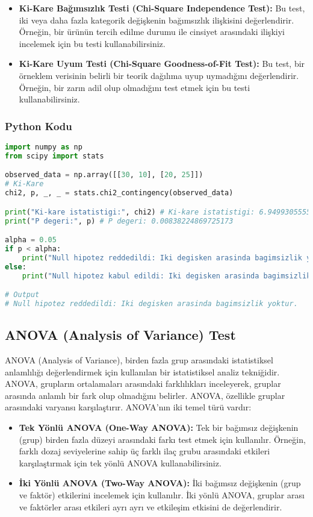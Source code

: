 \begin{itemize}
    \item \textbf{Ki-Kare Bağımsızlık Testi (Chi-Square Independence Test):} Bu test, iki veya daha fazla kategorik değişkenin bağımsızlık ilişkisini değerlendirir. Örneğin, bir ürünün tercih edilme durumu ile cinsiyet arasındaki ilişkiyi incelemek için bu testi kullanabilirsiniz.
    \item \textbf{Ki-Kare Uyum Testi (Chi-Square Goodness-of-Fit Test):} Bu test, bir örneklem verisinin belirli bir teorik dağılıma uyup uymadığını değerlendirir. Örneğin, bir zarın adil olup olmadığını test etmek için bu testi kullanabilirsiniz.
\end{itemize}

\subsubsection{Python Kodu}

\begin{lstlisting}[language=Python]
import numpy as np
from scipy import stats

observed_data = np.array([[30, 10], [20, 25]])
# Ki-Kare
chi2, p, _, _ = stats.chi2_contingency(observed_data)

print("Ki-kare istatistigi:", chi2) # Ki-kare istatistigi: 6.949930555555551
print("P degeri:", p) # P degeri: 0.00838224869725173

alpha = 0.05
if p < alpha:
    print("Null hipotez reddedildi: Iki degisken arasinda bagimsizlik yoktur.")
else:
    print("Null hipotez kabul edildi: Iki degisken arasinda bagimsizlik vardir.")

# Output
# Null hipotez reddedildi: Iki degisken arasinda bagimsizlik yoktur.
\end{lstlisting}

\newpage

\subsection{ANOVA (Analysis of Variance) Test}
ANOVA (Analysis of Variance), birden fazla grup arasındaki istatistiksel anlamlılığı değerlendirmek için kullanılan bir istatistiksel analiz tekniğidir. ANOVA, grupların ortalamaları arasındaki farklılıkları inceleyerek, gruplar arasında anlamlı bir fark olup olmadığını belirler. ANOVA, özellikle gruplar arasındaki varyansı karşılaştırır. ANOVA'nın iki temel türü vardır:

\begin{itemize}
    \item \textbf{Tek Yönlü ANOVA (One-Way ANOVA):} Tek bir bağımsız değişkenin (grup) birden fazla düzeyi arasındaki farkı test etmek için kullanılır. Örneğin, farklı dozaj seviyelerine sahip üç farklı ilaç grubu arasındaki etkileri karşılaştırmak için tek yönlü ANOVA kullanabilirsiniz.
    \item \textbf{İki Yönlü ANOVA (Two-Way ANOVA):} İki bağımsız değişkenin (grup ve faktör) etkilerini incelemek için kullanılır. İki yönlü ANOVA, gruplar arası ve faktörler arası etkileri ayrı ayrı ve etkileşim etkisini de değerlendirir.
\end{itemize}

